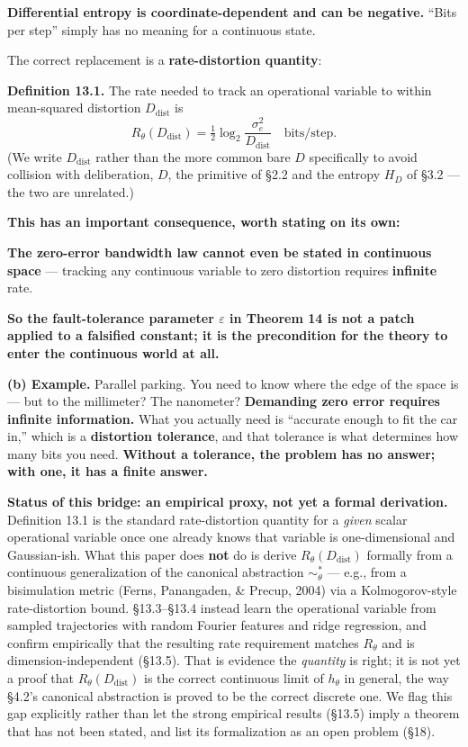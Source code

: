 \documentclass[11pt]{article}
\renewenvironment{quote}
  {\def\FrameCommand{{\color{gray!60}\vrule width 2pt}\hspace{8pt}}%
   \MakeFramed{\advance\hsize-\width \FrameRestore}\begin{itshape}}
  {\end{itshape}\endMakeFramed}
\begin{document}
\textbf{Differential entropy is coordinate-dependent and can be negative.} ``Bits per step'' simply has no meaning for a continuous state.

The correct replacement is a \textbf{rate-distortion quantity}:

\begin{quote}
\textbf{Definition 13.1.} The rate needed to track an operational variable to within mean-squared distortion \(D_{\mathrm{dist}}\) is
\[R_\theta(D_{\mathrm{dist}})=\tfrac12\log_2\frac{\sigma_e^2}{D_{\mathrm{dist}}}\quad\text{bits/step}.\]
(We write \(D_{\mathrm{dist}}\) rather than the more common bare \(D\) specifically to avoid collision with deliberation, \(D\), the primitive of \S{}2.2 and the entropy \(H_D\) of \S{}3.2 --- the two are unrelated.)
\end{quote}

\textbf{This has an important consequence, worth stating on its own:}

\begin{quote}
\textbf{The zero-error bandwidth law cannot even be stated in continuous space} --- tracking any continuous variable to zero distortion requires \textbf{infinite} rate.

\textbf{So the fault-tolerance parameter \(\varepsilon\) in Theorem 14 is not a patch applied to a falsified constant; it is the precondition for the theory to enter the continuous world at all.}
\end{quote}

\textbf{(b) Example.} Parallel parking. You need to know where the edge of the space is --- but to the millimeter? The nanometer? \textbf{Demanding zero error requires infinite information.} What you actually need is ``accurate enough to fit the car in,'' which is a \textbf{distortion tolerance}, and that tolerance is what determines how many bits you need. \textbf{Without a tolerance, the problem has no answer; with one, it has a finite answer.}

\textbf{Status of this bridge: an empirical proxy, not yet a formal derivation.} Definition 13.1 is the standard rate-distortion quantity for a \emph{given} scalar operational variable once one already knows that variable is one-dimensional and Gaussian-ish. What this paper does \textbf{not} do is derive \(R_\theta(D_{\mathrm{dist}})\) formally from a continuous generalization of the canonical abstraction \(\sim_\theta^*\) --- e.g., from a bisimulation metric (Ferns, Panangaden, \& Precup, 2004) via a Kolmogorov-style rate-distortion bound. \S{}13.3--\S{}13.4 instead learn the operational variable from sampled trajectories with random Fourier features and ridge regression, and confirm empirically that the resulting rate requirement matches \(R_\theta\) and is dimension-independent (\S{}13.5). That is evidence the \emph{quantity} is right; it is not yet a proof that \(R_\theta(D_{\mathrm{dist}})\) is the correct continuous limit of \(h_\theta\) in general, the way \S{}4.2's canonical abstraction is proved to be the correct discrete one. We flag this gap explicitly rather than let the strong empirical results (\S{}13.5) imply a theorem that has not been stated, and list its formalization as an open problem (\S{}18).
\end{document}

